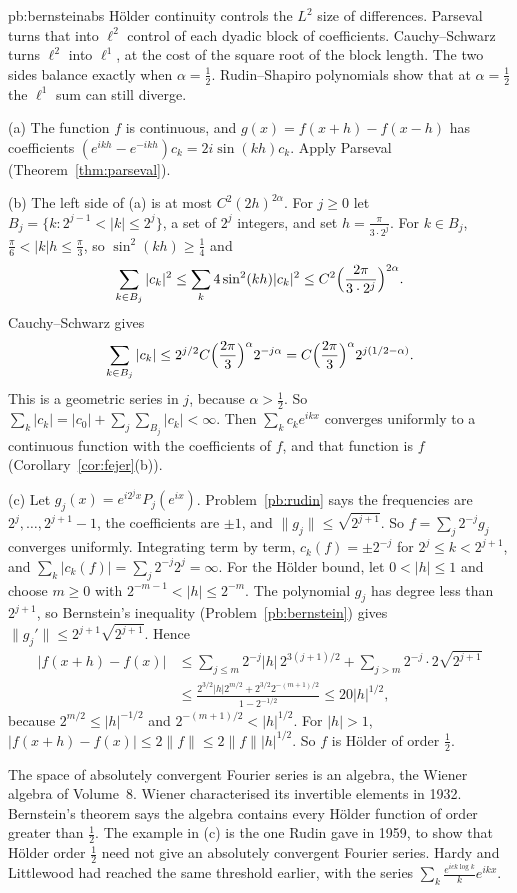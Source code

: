 \begin{solution}{pb:bernsteinabs}
\idea Hölder continuity controls the $L^2$ size of differences. Parseval turns that into $\ell^2$ control of each dyadic block of
coefficients. Cauchy--Schwarz turns $\ell^2$ into $\ell^1$, at the cost of the square root of the block length. The two sides balance exactly
when $\alpha=\frac12$. Rudin--Shapiro polynomials show that at $\alpha=\frac12$ the $\ell^1$ sum can still diverge.

\writeup (a) The function $f$ is continuous, and $g(x)=f(x+h)-f(x-h)$ has coefficients $(e^{ikh}-e^{-ikh})c_k=2i\sin(kh)c_k$. Apply Parseval (Theorem~\ref{thm:parseval}).

(b) The left side of (a) is at most $C^2(2h)^{2\alpha}$. For $j\ge0$ let $B_j=\{k:2^{j-1}<|k|\le2^j\}$, a set of $2^j$ integers, and set $h=\frac\pi{3\cdot2^j}$. For
$k\in B_j$, $\frac\pi6<|k|h\le\frac\pi3$, so $\sin^2(kh)\ge\frac14$ and
\[
\sum_{k\in B_j}|c_k|^2\le\sum_k4\sin^2(kh)|c_k|^2\le C^2\Bigl(\frac{2\pi}{3\cdot2^j}\Bigr)^{2\alpha}.
\]
Cauchy--Schwarz gives
\[
\sum_{k\in B_j}|c_k|\le2^{j/2}C\Bigl(\frac{2\pi}3\Bigr)^\alpha2^{-j\alpha}=C\Bigl(\frac{2\pi}3\Bigr)^\alpha2^{j(1/2-\alpha)}.
\]
This is a geometric series in $j$, because $\alpha>\frac12$. So
$\sum_k|c_k|=|c_0|+\sum_j\sum_{B_j}|c_k|<\infty$. Then $\sum_kc_ke^{ikx}$ converges uniformly to a continuous function with the coefficients of $f$, and that function is $f$
(Corollary~\ref{cor:fejer}(b)).

(c) Let $g_j(x)=e^{i2^jx}P_j(e^{ix})$. Problem~\ref{pb:rudin} says the frequencies are $2^j,\dots,2^{j+1}-1$, the coefficients are $\pm1$, and $\|g_j\|\le\sqrt{2^{j+1}}$. So
$f=\sum_j2^{-j}g_j$ converges uniformly. Integrating term by term, $c_k(f)=\pm2^{-j}$ for $2^j\le k<2^{j+1}$, and $\sum_k|c_k(f)|=\sum_j2^{-j}2^j=\infty$. For the Hölder
bound, let $0<|h|\le1$ and choose $m\ge0$ with $2^{-m-1}<|h|\le2^{-m}$. The polynomial $g_j$ has degree less than $2^{j+1}$, so Bernstein's inequality (Problem~\ref{pb:bernstein})
gives $\|g_j'\|\le2^{j+1}\sqrt{2^{j+1}}$. Hence
\[
\begin{aligned}|f(x+h)-f(x)|&\le\sum_{j\le m}2^{-j}|h|\,2^{3(j+1)/2}+\sum_{j>m}2^{-j}\cdot2\sqrt{2^{j+1}}\\&\le\frac{2^{3/2}|h|2^{m/2}+2^{3/2}2^{-(m+1)/2}}{1-2^{-1/2}}\le20|h|^{1/2},\end{aligned}
\]
because $2^{m/2}\le|h|^{-1/2}$ and $2^{-(m+1)/2}<|h|^{1/2}$. For $|h|>1$, $|f(x+h)-f(x)|\le2\|f\|\le2\|f\||h|^{1/2}$. So $f$ is Hölder of order $\frac12$.

\leads The space of absolutely convergent Fourier series is an algebra, the Wiener algebra of Volume~8. Wiener characterised its invertible elements
in 1932. Bernstein's theorem says the algebra contains every Hölder function of order greater than $\frac12$. The example in (c) is the one Rudin gave in 1959, to show that Hölder order $\frac12$ need not give an absolutely convergent Fourier series. Hardy and Littlewood had reached the same threshold earlier, with the series
$\sum_k\frac{e^{ick\log k}}ke^{ikx}$.
\end{solution}

